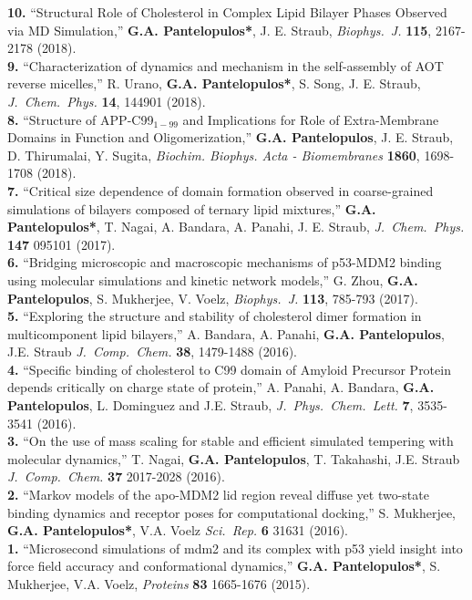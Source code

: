\documentclass[a4paper]{article}
\def\jcc{\it J.~Comp.~Chem.}
\def\jpcl{\it J.~Phys.~Chem.~Lett.}
\def\prot{\it Proteins}
\def\jcp{\it J.~Chem.~Phys.}
\def\bj{\it Biophys.~J.}
\def\jpcl{\it J.~Phys.~Chem.~Lett.}
\def\scirep{\it Sci.~Rep.}
\begin{document}
{\bf 10.} ``Structural Role of Cholesterol in Complex Lipid Bilayer Phases Observed via MD Simulation,'' \textbf{G.A. Pantelopulos*}, J. E. Straub, {\bj} {\bf 115}, 2167-2178 (2018). \\
{\bf 9.} ``Characterization of dynamics and mechanism in the self-assembly of AOT reverse micelles,'' R. Urano, \textbf{G.A. Pantelopulos*}, S. Song, J. E. Straub, {\jcp} {\bf 14}, 144901 (2018). \\
{\bf 8.} ``Structure of APP-C99$_{1-99}$ and Implications for Role of Extra-Membrane Domains in Function and Oligomerization,'' \textbf{G.A. Pantelopulos}, J. E. Straub, D. Thirumalai, Y. Sugita, \textit{Biochim. Biophys. Acta - Biomembranes} {\bf 1860}, 1698-1708 (2018). \\
{\bf 7.} ``Critical size dependence of domain formation observed in coarse-grained simulations of bilayers composed of ternary lipid mixtures,'' \textbf{G.A. Pantelopulos*}, T. Nagai, A. Bandara, A. Panahi, J. E. Straub, {\jcp} {\bf 147} 095101 (2017). \\
{\bf 6.} ``Bridging microscopic and macroscopic mechanisms of p53-MDM2 binding using molecular simulations and kinetic network models,'' G. Zhou, \textbf{G.A. Pantelopulos}, S. Mukherjee, V. Voelz, {\bj} {\bf 113},  785-793 (2017). \\
{\bf 5.} ``Exploring the structure and stability of cholesterol dimer formation in multicomponent lipid bilayers,'' A. Bandara, A. Panahi, \textbf{G.A. Pantelopulos}, J.E. Straub {\jcc} {\bf 38}, 1479-1488 (2016). \\
{\bf 4.}  ``Specific binding of cholesterol to C99 domain of Amyloid Precursor Protein depends critically on charge state of protein,'' A. Panahi, A. Bandara, \textbf{G.A. Pantelopulos}, L. Dominguez and J.E. Straub, {\jpcl} {\bf 7}, 3535-3541 (2016). \\
{\bf 3.} ``On the use of mass scaling for stable and efficient simulated tempering with molecular dynamics,'' T. Nagai, \textbf{G.A. Pantelopulos}, T. Takahashi, J.E. Straub {\jcc} {\bf 37} 2017-2028 (2016). \\
{\bf 2.} ``Markov models of the apo-MDM2 lid region reveal diffuse yet two-state binding dynamics and receptor poses for computational docking,'' S. Mukherjee, \textbf{G.A. Pantelopulos*}, V.A. Voelz {\scirep} {\bf 6} 31631 (2016). \\
{\bf 1.} ``Microsecond simulations of mdm2 and its complex with p53 yield insight into force field accuracy and conformational dynamics,'' \textbf{G.A. Pantelopulos*}, S. Mukherjee, V.A. Voelz, {\prot} {\bf 83} 1665-1676 (2015).
\end{document}
